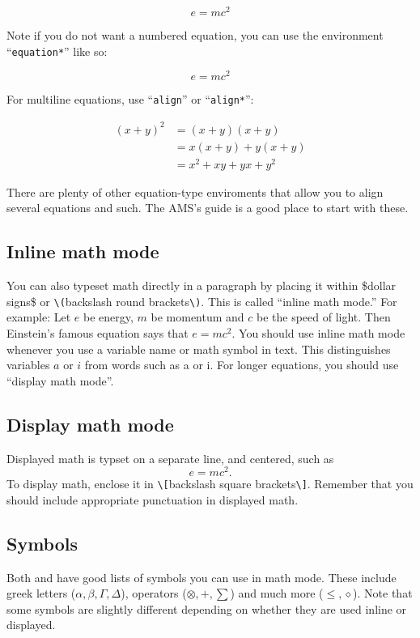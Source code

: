 \documentclass[11pt,oneside,draft]{amsart}
\begin{document}
\begin{equation}  e = mc^2
\end{equation}

Note if you do not want a numbered equation, you can use the
environment ``\texttt{equation*}''
 like so:

\begin{equation*}
e=mc^2
\end{equation*}

For multiline equations, use ``\texttt{align}'' or
``\texttt{align*}'':

\begin{align}
  (x + y)^2 & = (x+y) (x+y) \\
  & = x(x+y) + y(x+y) \nonumber\\
  & = x^2 + xy + yx + y^2 
\end{align}

There are plenty of other equation-type enviroments that allow you to
align several equations and such. The AMS's guide \cite{amsshort} is a
good place to start with these.


\subsection{Inline math mode}
You can also typeset math directly in a paragraph by placing it within
\$dollar signs\$ or \verb|\(|backslash round brackets\verb|\)|.  This is called ``inline math mode.''  For example: Let $e$
be energy, $m$ be momentum and $c$ be the speed of light.  Then
Einstein's famous equation says that \(e=mc^2\).  You should use inline
math mode whenever you use a variable name or math symbol in text.
This distinguishes variables $a$ or $i$ from words such as a or i.
For longer equations, you should use ``display math mode''.

\subsection{Display math mode}
Displayed math is typset on a separate line, and centered, such as
\[
e = mc^2.
\]
To display math, enclose it in \verb|\[|backslash square
brackets\verb|\]|.  Remember that you should include appropriate punctuation in
displayed math.

\subsection{Symbols}

Both \cite{notsoshort} and \cite{amsshort} have good lists of symbols
you can use in math mode.  These include greek letters ($\alpha,
\beta, \Gamma, \Delta$), operators ($\otimes, +, \sum$) and much more
($\leq, \diamond$).  Note that some symbols are slightly different
depending on whether they are used inline or displayed.
\end{document}
